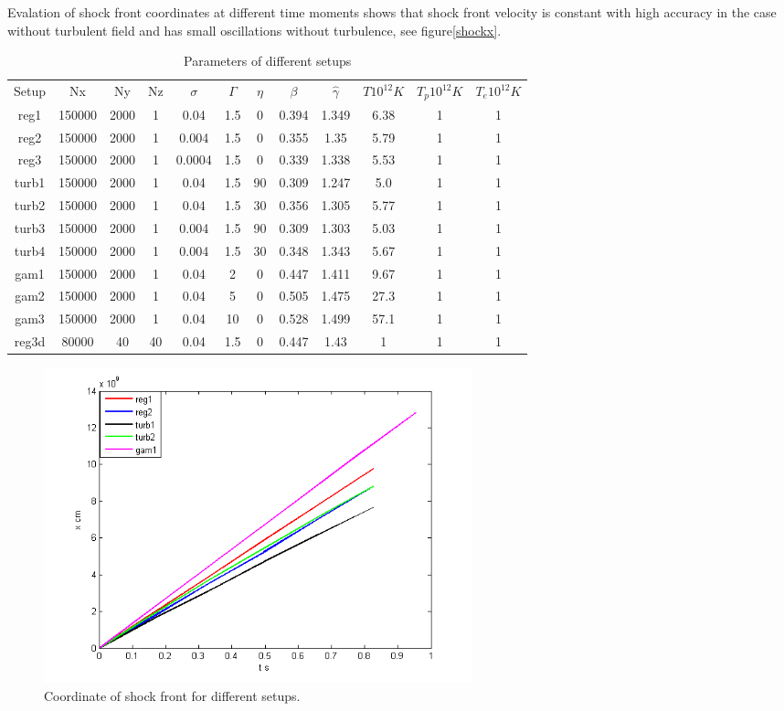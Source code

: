\documentclass[a4paper]{jpconf}
\begin{document}
Evalation of shock front coordinates at different time moments shows that shock front velocity is constant with high accuracy in the case without turbulent field and has small oscillations without turbulence, see figure\ref{shockx}.
\begin{table}
	\label{setups}
	\begin{center}
		\begin{tabular}{|c| c| c| c| c| c| c| c| c| c| c| c|}
		\hline
			Setup & Nx & Ny & Nz & $\sigma$ & $\Gamma$ & $\eta$ & $\beta$ & $\hat{\gamma}$ & $T  10^{12} K$ & $T_p  10^{12} K$ & $T_e  10^{12} K$\\
			reg1 & 150000 & 2000 & 1 & 0.04 & 1.5 & 0 & 0.394 & 1.349 & 6.38 & 1 & 1\\
			reg2 & 150000 & 2000 & 1 & 0.004 & 1.5 & 0 & 0.355 & 1.35 & 5.79 & 1 & 1\\
			reg3 & 150000 & 2000 & 1 & 0.0004 & 1.5 & 0 & 0.339 & 1.338 & 5.53 &1 & 1\\
			turb1 & 150000 & 2000 & 1 & 0.04 & 1.5 & 90 & 0.309 & 1.247 & 5.0 & 1 & 1\\
			turb2 & 150000 & 2000 & 1 & 0.04 & 1.5 & 30 & 0.356 & 1.305 & 5.77 & 1 & 1\\
			turb3 & 150000 & 2000 & 1 & 0.004 & 1.5 & 90 & 0.309 & 1.303 & 5.03 & 1 & 1\\
			turb4 & 150000 & 2000 & 1 & 0.004 & 1.5 & 30 & 0.348 & 1.343 & 5.67 & 1 & 1\\
			gam1 & 150000 & 2000 & 1 & 0.04 & 2 & 0 & 0.447 & 1.411 & 9.67 & 1 & 1\\
			gam2 & 150000 & 2000 & 1 & 0.04 & 5 & 0 & 0.505 & 1.475 & 27.3 & 1 & 1\\
			gam3 & 150000 & 2000 & 1 & 0.04 & 10 & 0 & 0.528 & 1.499 & 57.1 & 1 & 1\\
			reg3d & 80000 & 40 & 40 & 0.04 & 1.5 & 0 & 0.447 & 1.43 & 1 & 1 & 1\\
			
		\hline
		\end{tabular}
	\end{center}
	\caption{Parameters of different setups}
\end{table}

\begin{figure}[h!]
	\centering
	\includegraphics[width=0.6\textwidth]{fig/shock_x.png} 
	\caption{Coordinate of shock front for different setups.}
	\label{shock_x}
\end{figure}
\end{document}
